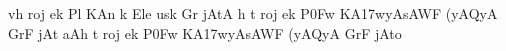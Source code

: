 \def\DevnagVersion{2.15}
{\dn vh roj ek Pl KAn\? k\? Ele usk\? Gr jAtA h\4 t\? roj ek P\30Fw\? KA\317wyAsAWF (yA\2QyA GrF jAt aAh\? t\? roj ek P\30Fw\? KA\317wyAsAWF (yA\2QyA GrF jAto }
